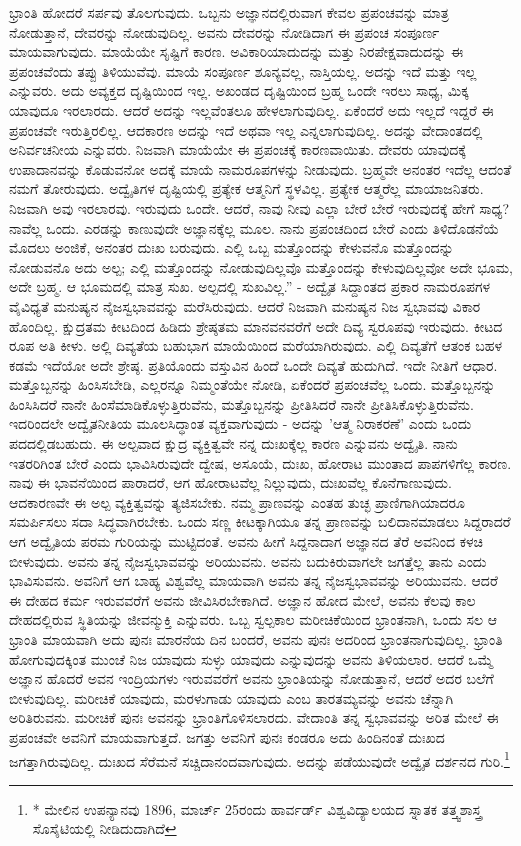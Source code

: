 ಭ್ರಾಂತಿ ಹೋದರೆ ಸರ್ಪವು ತೊಲಗುವುದು. ಒಬ್ಬನು ಅಜ್ಞಾನದಲ್ಲಿರುವಾಗ ಕೇವಲ ಪ್ರಪಂಚವನ್ನು ಮಾತ್ರ ನೋಡುತ್ತಾನೆ, ದೇವರನ್ನು ನೋಡುವುದಿಲ್ಲ. ಅವನು ದೇವರನ್ನು ನೋಡಿದಾಗ ಈ ಪ್ರಪಂಚ ಸಂಪೂರ್ಣ ಮಾಯವಾಗುವುದು. ಮಾಯೆಯೇ ಸೃಷ್ಟಿಗೆ ಕಾರಣ. ಅವಿಕಾರಿಯಾದುದನ್ನು ಮತ್ತು ನಿರಪೇಕ್ಷವಾದುದನ್ನು ಈ ಪ್ರಪಂಚವೆಂದು ತಪ್ಪು ತಿಳಿಯುವೆವು. ಮಾಯೆ ಸಂಪೂರ್ಣ ಶೂನ್ಯವಲ್ಲ, ನಾಸ್ತಿಯಲ್ಲ. ಅದನ್ನು ಇದೆ ಮತ್ತು ಇಲ್ಲ ಎನ್ನುವರು. ಅದು ಅವ್ಯಕ್ತದ ದೃಷ್ಟಿಯಿಂದ ಇಲ್ಲ. ಅಖಂಡದ ದೃಷ್ಟಿಯಿಂದ ಬ್ರಹ್ಮ ಒಂದೇ ಇರಲು ಸಾಧ್ಯ, ಮಿಕ್ಕ ಯಾವುದೂ ಇರಲಾರದು. ಆದರೆ ಅದನ್ನು ಇಲ್ಲವೆಂತಲೂ ಹೇಳಲಾಗುವುದಿಲ್ಲ. ಏಕೆಂದರೆ ಅದು ಇಲ್ಲದೆ ಇದ್ದರೆ ಈ ಪ್ರಪಂಚವೇ ಇರುತ್ತಿರಲಿಲ್ಲ. ಆದಕಾರಣ ಅದನ್ನು ಇದೆ ಅಥವಾ ಇಲ್ಲ ಎನ್ನಲಾಗುವುದಿಲ್ಲ. ಅದನ್ನು ವೇದಾಂತದಲ್ಲಿ ಅನಿರ್ವಚನೀಯ ಎನ್ನುವರು. ನಿಜವಾಗಿ ಮಾಯೆಯೇ ಈ ಪ್ರಪಂಚಕ್ಕೆ ಕಾರಣವಾಯಿತು. ದೇವರು ಯಾವುದಕ್ಕೆ ಉಪಾದಾನವನ್ನು ಕೊಡುವನೋ ಅದಕ್ಕೆ ಮಾಯೆ ನಾಮರೂಪಗಳನ್ನು ನೀಡುವುದು. ಬ್ರಹ್ಮವೇ ಅನಂತರ ಇದೆಲ್ಲ ಆದಂತೆ ನಮಗೆ ತೋರುವುದು. ಅದ್ವೈತಿಗಳ ದೃಷ್ಟಿಯಲ್ಲಿ ಪ್ರತ್ಯೇಕ ಆತ್ಮನಿಗೆ ಸ್ಥಳವಿಲ್ಲ. ಪ್ರತ್ಯೇಕ ಆತ್ಮರೆಲ್ಲ ಮಾಯಾಜನಿತರು. ನಿಜವಾಗಿ ಅವು ಇರಲಾರವು. ಇರುವುದು ಒಂದೇ. ಆದರೆ, ನಾವು ನೀವು ಎಲ್ಲಾ ಬೇರೆ ಬೇರೆ ಇರುವುದಕ್ಕೆ ಹೇಗೆ ಸಾಧ್ಯ? ನಾವೆಲ್ಲ ಒಂದು. ಎರಡನ್ನು ಕಾಣುವುದೇ ಅಜ್ಞಾನಕ್ಕೆಲ್ಲ ಮೂಲ. ನಾನು ಪ್ರಪಂಚದಿಂದ ಬೇರೆ ಎಂದು ತಿಳಿದೊಡನೆಯೆ ಮೊದಲು ಅಂಜಿಕೆ, ಅನಂತರ ದುಃಖ ಬರುವುದು. ಎಲ್ಲಿ ಒಬ್ಬ ಮತ್ತೊಂದನ್ನು ಕೇಳುವನೊ ಮತ್ತೊಂದನ್ನು ನೋಡುವನೊ ಅದು ಅಲ್ಪ; ಎಲ್ಲಿ ಮತ್ತೊಂದನ್ನು ನೋಡುವುದಿಲ್ಲವೊ ಮತ್ತೊಂದನ್ನು ಕೇಳುವುದಿಲ್ಲವೋ ಅದೇ ಭೂಮ, ಅದೇ ಬ್ರಹ್ಮ. ಆ ಭೂಮದಲ್ಲಿ ಮಾತ್ರ ಸುಖ. ಅಲ್ಪದಲ್ಲಿ ಸುಖವಿಲ್ಲ.” - ಅದ್ವೈತ ಸಿದ್ದಾಂತದ ಪ್ರಕಾರ ನಾಮರೂಪಗಳ ವೈವಿಧ್ಯತೆ ಮನುಷ್ಯನ ನೈಜಸ್ವಭಾವವನ್ನು ಮರೆಸಿರುವುದು. ಆದರೆ ನಿಜವಾಗಿ ಮನುಷ್ಯನ ನಿಜ ಸ್ವಭಾವವು ವಿಕಾರ ಹೊಂದಿಲ್ಲ. ಕ್ಷುದ್ರತಮ ಕೀಟದಿಂದ ಹಿಡಿದು ಶ್ರೇಷ್ಠತಮ ಮಾನವನವರೆಗೆ ಅದೇ ದಿವ್ಯ ಸ್ವರೂಪವು ಇರುವುದು. ಕೀಟದ ರೂಪ ಅತಿ ಕೀಳು. ಅಲ್ಲಿ ದಿವ್ಯತೆಯ ಬಹುಭಾಗ ಮಾಯೆಯಿಂದ ಮರೆಯಾಗಿರುವುದು. ಎಲ್ಲಿ ದಿವ್ಯತೆಗೆ ಆತಂಕ ಬಹಳ ಕಡಮೆ ಇದೆಯೋ ಅದೇ ಶ್ರೇಷ್ಠ. ಪ್ರತಿಯೊಂದು ವಸ್ತುವಿನ ಹಿಂದೆ ಒಂದೇ ದಿವ್ಯತೆ ಹುದುಗಿದೆ. ಇದೇ ನೀತಿಗೆ ಆಧಾರ. ಮತ್ತೊಬ್ಬನನ್ನು ಹಿಂಸಿಸಬೇಡಿ, ಎಲ್ಲರನ್ನೂ ನಿಮ್ಮಂತೆಯೇ ನೋಡಿ, ಏಕೆಂದರೆ ಪ್ರಪಂಚವೆಲ್ಲ ಒಂದು. ಮತ್ತೊಬ್ಬನನ್ನು ಹಿಂಸಿಸಿದರೆ ನಾನೇ ಹಿಂಸೆಮಾಡಿಕೊಳ್ಳುತ್ತಿರುವೆನು, ಮತ್ತೊಬ್ಬನನ್ನು ಪ್ರೀತಿಸಿದರೆ ನಾನೇ ಪ್ರೀತಿಸಿಕೊಳ್ಳುತ್ತಿರುವೆನು. ಇದರಿಂದಲೇ ಅದ್ವೈತನೀತಿಯ ಮೂಲಸಿದ್ಧಾಂತ ವ್ಯಕ್ತವಾಗುವುದು - ಅದನ್ನು 'ಆತ್ಮ ನಿರಾಕರಣೆ' ಎಂದು ಒಂದು ಪದದಲ್ಲಿಡಬಹುದು. ಈ ಅಲ್ಪವಾದ ಕ್ಷುದ್ರ ವ್ಯಕ್ತಿತ್ವವೇ ನನ್ನ ದುಃಖಕ್ಕೆಲ್ಲ ಕಾರಣ ಎನ್ನುವನು ಅದ್ವೈತಿ. ನಾನು ಇತರರಿಗಿಂತ ಬೇರೆ ಎಂದು ಭಾವಿಸಿರುವುದೇ ದ್ವೇಷ, ಅಸೂಯೆ, ದುಃಖ, ಹೋರಾಟ ಮುಂತಾದ ಪಾಪಗಳಿಗೆಲ್ಲ ಕಾರಣ. ನಾವು ಈ ಭಾವನೆಯಿಂದ ಪಾರಾದರೆ, ಆಗ ಹೋರಾಟವೆಲ್ಲ ನಿಲ್ಲುವುದು, ದುಃಖವೆಲ್ಲ ಕೊನೆಗಾಣುವುದು. ಆದಕಾರಣವೇ ಈ ಅಲ್ಪ ವ್ಯಕ್ತಿತ್ವವನ್ನು ತ್ಯಜಿಸಬೇಕು. ನಮ್ಮ ಪ್ರಾಣವನ್ನು ಎಂತಹ ತುಚ್ಛ ಪ್ರಾಣಿಗಾಗಿಯಾದರೂ ಸಮರ್ಪಿಸಲು ಸದಾ ಸಿದ್ಧವಾಗಿರಬೇಕು. ಒಂದು ಸಣ್ಣ ಕೀಟಕ್ಕಾಗಿಯೂ ತನ್ನ ಪ್ರಾಣವನ್ನು ಬಲಿದಾನಮಾಡಲು ಸಿದ್ದರಾದರೆ ಆಗ ಅದ್ವೈತಿಯ ಪರಮ ಗುರಿಯನ್ನು ಮುಟ್ಟಿದಂತೆ. ಅವನು ಹೀಗೆ ಸಿದ್ದನಾದಾಗ ಅಜ್ಞಾನದ ತೆರೆ ಅವನಿಂದ ಕಳಚಿ ಬೀಳುವುದು. ಅವನು ತನ್ನ ನೈಜಸ್ವಭಾವವನ್ನು ಅರಿಯುವನು. ಅವನು ಬದುಕಿರುವಾಗಲೇ ಜಗತ್ತೆಲ್ಲ ತಾನು ಎಂದು ಭಾವಿಸುವನು. ಅವನಿಗೆ ಆಗ ಬಾಹ್ಯ ವಿಶ್ವವೆಲ್ಲ ಮಾಯವಾಗಿ ಅವನು ತನ್ನ ನೈಜಸ್ವಭಾವವನ್ನು ಅರಿಯುವನು. ಆದರೆ ಈ ದೇಹದ ಕರ್ಮ ಇರುವವರೆಗೆ ಅವನು ಜೀವಿಸಿರಬೇಕಾಗಿದೆ. ಅಜ್ಞಾನ ಹೋದ ಮೇಲೆ, ಅವನು ಕೆಲವು ಕಾಲ ದೇಹದಲ್ಲಿರುವ ಸ್ಥಿತಿಯನ್ನು ಜೀವನ್ಮುಕ್ತಿ ಎನ್ನುವರು. ಒಬ್ಬ ಸ್ವಲ್ಪಕಾಲ ಮರೀಚಿಕೆಯಿಂದ ಭ್ರಾಂತನಾಗಿ, ಒಂದು ಸಲ ಆ ಭ್ರಾಂತಿ ಮಾಯವಾಗಿ ಅದು ಪುನಃ ಮಾರನೆಯ ದಿನ ಬಂದರೆ, ಅವನು ಪುನಃ ಅದರಿಂದ ಭ್ರಾಂತನಾಗುವುದಿಲ್ಲ. ಭ್ರಾಂತಿ ಹೋಗುವುದಕ್ಕಿಂತ ಮುಂಚೆ ನಿಜ ಯಾವುದು ಸುಳ್ಳು ಯಾವುದು ಎನ್ನುವುದನ್ನು ಅವನು ತಿಳಿಯಲಾರ. ಆದರೆ ಒಮ್ಮೆ ಅಜ್ಞಾನ ಹೊದರೆ ಅವನ ಇಂದ್ರಿಯಗಳು ಇರುವವರೆಗೆ ಅವನು ಭ್ರಾಂತಿಯನ್ನು ನೋಡುತ್ತಾನೆ, ಆದರೆ ಅದರ ಬಲೆಗೆ ಬೀಳುವುದಿಲ್ಲ. ಮರೀಚಿಕೆ ಯಾವುದು, ಮರಳುಗಾಡು ಯಾವುದು ಎಂಬ ತಾರತಮ್ಯವನ್ನು ಅವನು ಚೆನ್ನಾಗಿ ಅರಿತಿರುವನು. ಮರೀಚಿಕೆ ಪುನಃ ಅವನನ್ನು ಭ್ರಾಂತಿಗೊಳಿಸಲಾರದು. ವೇದಾಂತಿ ತನ್ನ ಸ್ವಭಾವವನ್ನು ಅರಿತ ಮೇಲೆ ಈ ಪ್ರಪಂಚವೇ ಅವನಿಗೆ ಮಾಯವಾಗುತ್ತದೆ. ಜಗತ್ತು ಅವನಿಗೆ ಪುನಃ ಕಂಡರೂ ಅದು ಹಿಂದಿನಂತೆ ದುಃಖದ ಜಗತ್ತಾಗಿರುವುದಿಲ್ಲ. ದುಃಖದ ಸೆರೆಮನೆ ಸಚ್ಚಿದಾನಂದವಾಗುವುದು. ಅದನ್ನು ಪಡೆಯುವುದೇ ಅದ್ವೈತ ದರ್ಶನದ ಗುರಿ.\footnote{* ಮೇಲಿನ ಉಪನ್ಯಾನವು 1896, ಮಾರ್ಚ್ 25ರಂದು ಹಾರ್ವರ್ಡ್ ವಿಶ್ವವಿದ್ಯಾಲಯದ ಸ್ನಾತಕ ತತ್ತ್ವಶಾಸ್ತ್ರ ಸೊಸೈಟಿಯಲ್ಲಿ ನೀಡಿದುದಾಗಿದೆ}

